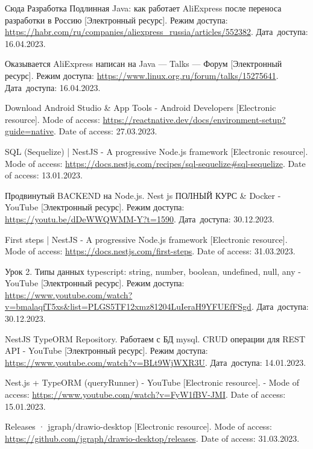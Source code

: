 \begin{thebibliography}{}
    Сюда Разработка Подлинная Java: как работает AliExpress после переноса разработки в Россию
    [Электронный ресурс].
    Режим доступа: \url{https://habr.com/ru/companies/aliexpress_russia/articles/552382}.
    Дата~доступа: 16.04.2023.

    Оказывается AliExpress написан на Java — Talks — Форум
    [Электронный ресурс].
    Режим доступа: \url{https://www.linux.org.ru/forum/talks/15275641}.
    Дата~доступа: 16.04.2023.

    Download Android Studio \& App Tools - Android Developers
    [Electronic resource].
    Mode of access: \url{https://reactnative.dev/docs/environment-setup?guide=native}.
    Date of access: 27.03.2023.

    SQL (Sequelize) | NestJS - A progressive Node.js framework
    [Electronic resource].
    Mode of access: \url{https://docs.nestjs.com/recipes/sql-sequelize#sql-sequelize}.
    Date of access: 13.01.2023.

    Продвинутый BACKEND на Node.js. Nest js ПОЛНЫЙ КУРС \& Docker - YouTube
    [Электронный ресурс].
    Режим доступа: \url{https://youtu.be/dDeWWQWMM-Y?t=1590}.
    Дата~доступа: 30.12.2023.

    First steps | NestJS - A progressive Node.js framework
    [Electronic resource].
    Mode of access: \url{https://docs.nestjs.com/first-steps}.
    Date of access: 31.03.2023.

    Урок 2. Типы данных typescript: string, number, boolean, undefined, null, any - YouTube
    [Электронный ресурс].
    Режим доступа: \url{https://www.youtube.com/watch?v=bmalaqfT5xs&list=PLGS5TF12xmz81204LuIeraH9YFUEfFSgd}.
    Дата~доступа: 30.12.2023.

    NestJS TypeORM Repository. Работаем с БД mysql. CRUD операции для REST API - YouTube
    [Электронный ресурс].
    Режим доступа: \url{https://www.youtube.com/watch?v=BLt9WjWXR3U}.
    Дата~доступа: 14.01.2023.

    Nest.js + TypeORM (queryRunner) - YouTube
    [Electronic resource]. -
    Mode of access: \url{https://www.youtube.com/watch?v=FyW1fBV-JMI}.
    Date of access: 15.01.2023.

    Releases · jgraph/drawio-desktop
    [Electronic resource].
    Mode of access: \url{https://github.com/jgraph/drawio-desktop/releases}.
    Date of access: 31.03.2023.


\end{thebibliography}
